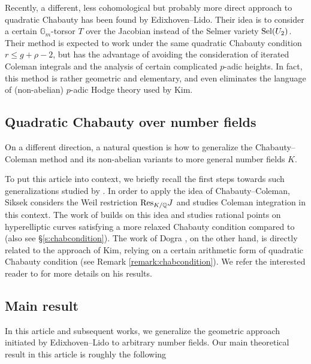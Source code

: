 \documentclass[11pt,oneside]{amsart}
\theoremstyle{plain}
\theoremstyle{definition}
\DeclareMathOperator{\Gm}{\mathbb{G}_m}
\def\Q{\mathbb{Q}}
\def\Gm{{\mathbb{G}_m}}
\begin{document}
Recently, a different, less cohomological but probably more direct approach to quadratic Chabauty has been found by Edixhoven--Lido. Their idea is to consider a certain $\Gm$-torsor $T$ over the Jacobian instead of the Selmer variety $\textup{Sel}(U_2)$. Their method is expected to work under the same quadratic Chabauty condition $r \le g+\rho - 2$, but has the advantage of avoiding the consideration of iterated Coleman integrals and the analysis of certain complicated $p$-adic heights. In fact, this method is rather geometric and elementary, and even eliminates the language of (non-abelian) $p$-adic Hodge theory used by Kim. 

\subsection{Quadratic Chabauty over number fields} \label{ss:other_work_K}
On a different direction, a natural question is how to generalize the Chabauty--Coleman method and its non-abelian variants to more general number fields $K$. 

To put this article into context, we briefly recall the first steps towards such generalizations studied by \cite{siksek, BBBM19, Dogra19}. In order to  apply the idea of Chabauty--Coleman, Siksek \cite{siksek} considers the Weil restriction $\textup{Res}_{K/\Q} J$ and studies Coleman integration in this context. The work of \cite{BBBM19} builds on this idea and studies rational points on hyperelliptic curves satisfying a more relaxed Chabauty condition compared to \cite{siksek} (also see \S \ref{s:chabcondition}). The work of Dogra \cite{Dogra19}, on the other hand, is directly related to the approach of Kim, relying on a certain arithmetic form of quadratic Chabauty condition (see Remark \ref{remark:chabcondition}). We refer the interested reader to  \cite{Dogra19} for more details on his results. 

\subsection{Main result}
In this article and subsequent works, we generalize the geometric approach initiated by Edixhoven--Lido to arbitrary number fields. Our main theoretical result in this article is roughly the following 
\end{document}
